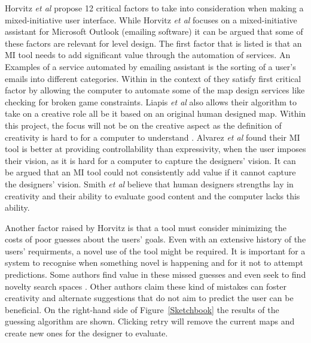 \documentclass[journal]{IEEEtran}
\begin{document}
Horvitz \textit{et al} \cite{horvitz1999principles} propose 12 critical factors to take into consideration when making a mixed-initiative user interface. While Horvitz \textit{et al} \cite{horvitz1999principles}  focuses on a mixed-initiative assistant for Microsoft Outlook (emailing software) it can be argued that some of these factors are relevant for level design.  The first factor that is listed is that an MI tool needs to add significant value through the automation of services. An Examples of a service automated by emailing assistant is the sorting of a user's emails into different categories.   Within in the context of \cite{liapis2013sentient}  they satisfy \cite{horvitz1999principles} first critical factor by allowing the computer to automate some of the map design services like checking for broken game constraints. Liapis \textit{et al} \cite{liapis2013sentient} also allows their algorithm to take on a creative role all be it based on an original human designed map. Within this project, the focus will not be on the creative aspect as the definition of creativity is hard to for a computer to understand \cite{jordanous2010defining}. Alvarez \textit{et al}\cite{alvarez2018fostering} found their MI tool is better at providing controllability than expressivity, when the user imposes their vision, as it is hard for a computer to capture the designers' vision. It can be argued that an MI tool could not consistently add value if it cannot capture the designers' vision. Smith \textit{et al}\cite{smith2011tanagra} believe that human designers strengths lay in creativity and their ability to evaluate good content and the computer lacks this ability. 

Another factor raised by Horvitz \cite{horvitz1999principles} is that a tool must consider minimizing the costs of poor guesses about the users' goals. Even with an extensive history of the users' requirments, a novel use of the tool might be required. It is important for a system to recognise when something novel is happening and for it not to attempt predictions.  Some authors find value in these missed guesses and even seek to find novelty search spaces \cite{liapis2013sentient}. Other authors \cite{liapis2016can,alvarez2018fostering, yannakakis2014mixed} claim these kind of mistakes can foster creativity and alternate suggestions that do not aim to predict the user can be beneficial. On the right-hand side of Figure~\ref{Sketchbook} the results of the guessing algorithm are shown. Clicking retry will remove the current maps and create new ones for the designer to evaluate.
\end{document}
